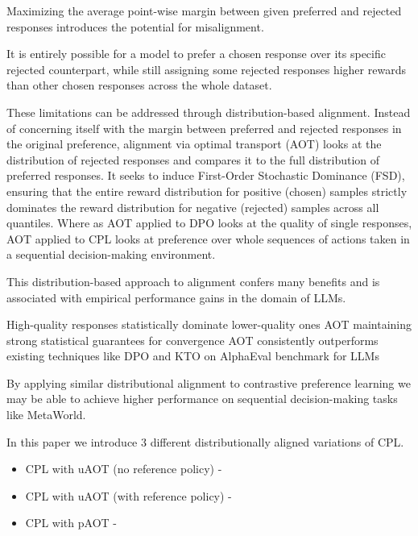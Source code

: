\documentclass[11pt]{article}
\begin{document}
        
        Maximizing the average point-wise margin between given preferred and rejected responses introduces the potential for misalignment.

        It is entirely possible for a model to prefer a chosen response over its specific rejected counterpart, while still assigning some rejected responses higher rewards than other chosen responses across the whole dataset.


        These limitations can be addressed through distribution-based alignment. Instead of concerning itself with the margin between preferred and rejected responses in the original preference, alignment via optimal transport (AOT) looks at the distribution of rejected responses and compares it to the full distribution of preferred responses. It seeks to induce First-Order Stochastic Dominance (FSD), ensuring that the entire reward distribution for positive (chosen) samples strictly dominates the reward distribution for negative (rejected) samples across all quantiles. Where as AOT applied to DPO looks at the quality of single responses, AOT applied to CPL looks at preference over whole sequences of actions taken in a sequential decision-making environment.


        This distribution-based approach to alignment confers many benefits and is associated with empirical performance gains in the domain of LLMs.

        High-quality responses statistically dominate lower-quality ones
        AOT maintaining strong statistical guarantees for convergence
        AOT consistently outperforms existing techniques like DPO and KTO on AlphaEval benchmark for LLMs
    

        By applying similar distributional alignment to contrastive preference learning we may be able to achieve higher performance on sequential decision-making tasks like MetaWorld.

        In this paper we introduce 3 different distributionally aligned variations of CPL.

\begin{itemize}
    \item CPL with uAOT (no reference policy) - 
    \item CPL with uAOT (with reference policy) - 
    \item CPL with pAOT - 

\end{itemize}
\end{document}
